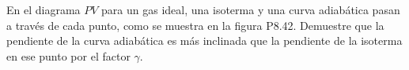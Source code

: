 \item En el diagrama $PV$ para un gas ideal, una isoterma y una curva adiabática pasan a través de cada punto, como se muestra en la figura P8.42. Demuestre que la pendiente de la curva adiabática es más inclinada que la pendiente de la isoterma en ese punto por el factor $\gamma$.
